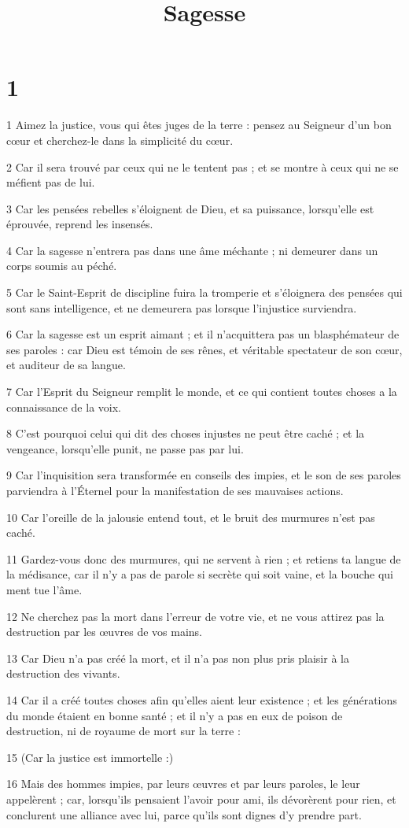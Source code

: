 

\title{Sagesse}


\chapter{1}

\par 1 Aimez la justice, vous qui êtes juges de la terre : pensez au Seigneur d'un bon cœur et cherchez-le dans la simplicité du cœur.
\par 2 Car il sera trouvé par ceux qui ne le tentent pas ; et se montre à ceux qui ne se méfient pas de lui.
\par 3 Car les pensées rebelles s'éloignent de Dieu, et sa puissance, lorsqu'elle est éprouvée, reprend les insensés.
\par 4 Car la sagesse n'entrera pas dans une âme méchante ; ni demeurer dans un corps soumis au péché.
\par 5 Car le Saint-Esprit de discipline fuira la tromperie et s'éloignera des pensées qui sont sans intelligence, et ne demeurera pas lorsque l'injustice surviendra.
\par 6 Car la sagesse est un esprit aimant ; et il n'acquittera pas un blasphémateur de ses paroles : car Dieu est témoin de ses rênes, et véritable spectateur de son cœur, et auditeur de sa langue.
\par 7 Car l'Esprit du Seigneur remplit le monde, et ce qui contient toutes choses a la connaissance de la voix.
\par 8 C'est pourquoi celui qui dit des choses injustes ne peut être caché ; et la vengeance, lorsqu'elle punit, ne passe pas par lui.
\par 9 Car l'inquisition sera transformée en conseils des impies, et le son de ses paroles parviendra à l'Éternel pour la manifestation de ses mauvaises actions.
\par 10 Car l'oreille de la jalousie entend tout, et le bruit des murmures n'est pas caché.
\par 11 Gardez-vous donc des murmures, qui ne servent à rien ; et retiens ta langue de la médisance, car il n'y a pas de parole si secrète qui soit vaine, et la bouche qui ment tue l'âme.
\par 12 Ne cherchez pas la mort dans l'erreur de votre vie, et ne vous attirez pas la destruction par les œuvres de vos mains.
\par 13 Car Dieu n'a pas créé la mort, et il n'a pas non plus pris plaisir à la destruction des vivants.
\par 14 Car il a créé toutes choses afin qu'elles aient leur existence ; et les générations du monde étaient en bonne santé ; et il n'y a pas en eux de poison de destruction, ni de royaume de mort sur la terre :
\par 15 (Car la justice est immortelle :)
\par 16 Mais des hommes impies, par leurs œuvres et par leurs paroles, le leur appelèrent ; car, lorsqu'ils pensaient l'avoir pour ami, ils dévorèrent pour rien, et conclurent une alliance avec lui, parce qu'ils sont dignes d'y prendre part.

